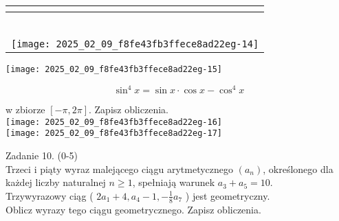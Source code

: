 \documentclass[10pt]{article}
\begin{document}
\begin{center}
\begin{tabular}{|c|c|c|c|c|c|c|c|c|c|c|c|c|c|c|c|c|c|c|c|c|c|c|c|c|}
\hline
\multicolumn{25}{|l|}{} \\
\hline
\multicolumn{25}{|l|}{} \\
\hline
\multicolumn{25}{|l|}{} \\
\hline
\multicolumn{25}{|l|}{} \\
\hline
\multicolumn{25}{|l|}{} \\
\hline
\multicolumn{25}{|l|}{} \\
\hline
\multicolumn{25}{|l|}{} \\
\hline
\multicolumn{25}{|l|}{\multirow[t]{3}{*}{\texttt{[image: 2025\_02\_09\_f8fe43fb3ffece8ad22eg-14]}
}} \\
\hline
 &  &  &  &  &  &  &  &  &  &  &  &  &  &  &  &  &  &  &  &  &  &  &  &  \\
\hline
 &  &  &  &  &  &  &  &  &  &  &  &  &  &  &  &  &  &  &  &  &  &  &  &  \\
\hline
\end{tabular}
\end{center}

\begin{center}
\texttt{[image: 2025\_02\_09\_f8fe43fb3ffece8ad22eg-15]}
\end{center}

\[
\sin ^{4} x=\sin x \cdot \cos x-\cos ^{4} x
\]

w zbiorze \([-\pi, 2 \pi]\). Zapisz obliczenia.\\
\texttt{[image: 2025\_02\_09\_f8fe43fb3ffece8ad22eg-16]}\\
\texttt{[image: 2025\_02\_09\_f8fe43fb3ffece8ad22eg-17]}

Zadanie 10. (0-5)\\
Trzeci i piąty wyraz malejącego ciągu arytmetycznego \(\left(a_{n}\right)\), określonego dla każdej liczby naturalnej \(n \geq 1\), spełniają warunek \(a_{3}+a_{5}=10\).\\
Trzywyrazowy ciąg ( \(2 a_{1}+4, a_{4}-1,-\frac{1}{8} a_{7}\) ) jest geometryczny.\\
Oblicz wyrazy tego ciągu geometrycznego. Zapisz obliczenia.
\end{document}
